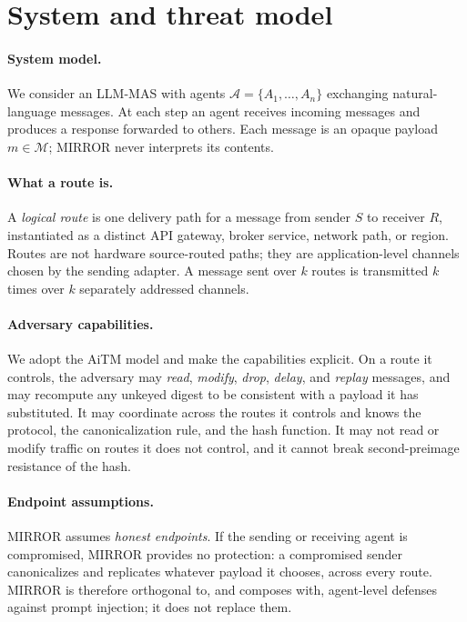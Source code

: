 \documentclass{article}
\begin{document}
\section{System and threat model}
\label{sec:threat}

\paragraph{System model.}
We consider an LLM-MAS with agents $\mathcal{A} = \{A_1, \dots, A_n\}$ exchanging natural-language messages. At each step an agent receives incoming messages and produces a response forwarded to others. Each message is an opaque payload $m \in \mathcal{M}$; MIRROR never interprets its contents.

\paragraph{What a route is.}
A \emph{logical route} is one delivery path for a message from sender $S$ to receiver $R$, instantiated as a distinct API gateway, broker service, network path, or region. Routes are not hardware source-routed paths; they are application-level channels chosen by the sending adapter. A message sent over $k$ routes is transmitted $k$ times over $k$ separately addressed channels.

\paragraph{Adversary capabilities.}
We adopt the AiTM model \citep{he2025redteaming} and make the capabilities explicit. On a route it controls, the adversary may \emph{read}, \emph{modify}, \emph{drop}, \emph{delay}, and \emph{replay} messages, and may recompute any unkeyed digest to be consistent with a payload it has substituted. It may coordinate across the routes it controls and knows the protocol, the canonicalization rule, and the hash function. It may not read or modify traffic on routes it does not control, and it cannot break second-preimage resistance of the hash.

\paragraph{Endpoint assumptions.}
MIRROR assumes \emph{honest endpoints}. If the sending or receiving agent is compromised, MIRROR provides no protection: a compromised sender canonicalizes and replicates whatever payload it chooses, across every route. MIRROR is therefore orthogonal to, and composes with, agent-level defenses against prompt injection; it does not replace them.
\end{document}
